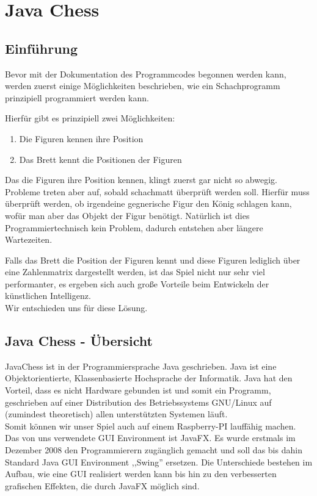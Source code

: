 \documentclass[12pt,a4paper]{article}
\begin{document}
{ 
\clearpage\vfill\newpage{}

\section{Java Chess}
\label{SEC:JAVACHESS}

\subsection{Einführung}
\label{SUBSEC:JAVACHESS-INTRO}

Bevor mit der Dokumentation des Programmcodes begonnen werden kann, werden zuerst einige Möglichkeiten beschrieben, wie ein Schachprogramm prinzipiell programmiert werden kann.

Hierfür gibt es prinzipiell zwei Möglichkeiten:
\begin{enumerate}
	\item{Die Figuren kennen ihre Position}
	\item{Das Brett kennt die Positionen der Figuren}
\end{enumerate}

Das die Figuren ihre Position kennen, klingt zuerst gar nicht so abwegig. Probleme treten aber auf, sobald schachmatt überprüft werden soll. Hierfür muss überprüft werden, ob irgendeine gegnerische Figur den König schlagen kann, wofür man aber das Objekt der Figur benötigt. Natürlich ist dies Programmiertechnisch kein Problem, dadurch entstehen aber längere Wartezeiten. 


Falls das Brett die Position der Figuren kennt und diese Figuren lediglich über eine Zahlenmatrix dargestellt werden, ist das Spiel nicht nur sehr viel performanter, es ergeben sich auch große Vorteile beim Entwickeln der künstlichen Intelligenz. \\ 
Wir entschieden uns für diese Lösung.

\subsection{Java Chess - Übersicht}
\label{SUBSEC:JAVACHESS-OVERVIEW}

JavaChess ist in der Programmiersprache Java geschrieben. Java ist eine Objektorientierte, Klassenbasierte Hochsprache der Informatik. Java hat den Vorteil, dass es nicht Hardware gebunden ist und somit ein Programm, geschrieben auf einer Distribution des Betriebssystems GNU/Linux auf (zumindest theoretisch) allen unterstützten Systemen läuft. \\
Somit können wir unser Spiel auch auf einem Raspberry-PI lauffähig machen. \\
Das von uns verwendete GUI Environment ist JavaFX. Es wurde erstmals im Dezember 2008 den Programmierern zugänglich gemacht und soll das bis dahin Standard Java GUI Environment ,,Swing'' ersetzen. Die Unterschiede bestehen im Aufbau, wie eine GUI realisiert werden kann bis hin zu den verbesserten grafischen Effekten, die durch JavaFX möglich sind. \\

}
\end{document}

